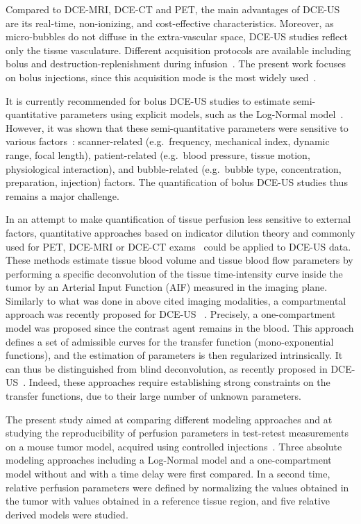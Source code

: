 Compared to DCE-MRI, DCE-CT and PET, the main advantages of DCE-US are its real-time, non-ionizing, and cost-effective characteristics. Moreover, as micro-bubbles do not diffuse in the extra-vascular space, DCE-US studies reflect only the tissue vasculature. 
Different acquisition protocols are available including bolus and destruction-replenishment during infusion~\cite{Wei1998tc}. The present work focuses on bolus injections, since this acquisition mode is the most widely used~\cite{Dietrich2012kw}. 

It is currently recommended for bolus DCE-US studies to estimate semi-quantitative parameters using explicit models, such as the Log-Normal model~\cite{Strouthos2010it}. 
However, it was shown that these semi-quantitative parameters were sensitive to various factors~\cite{Tang2011fj}: scanner-related (e.g.~frequency, mechanical index, dynamic range, focal length), patient-related (e.g.~blood pressure, tissue motion, physiological interaction), and bubble-related (e.g.~bubble type, concentration, preparation, injection) factors. The quantification of bolus DCE-US studies thus remains a major challenge.

In an attempt to make quantification of tissue perfusion less sensitive to external factors, quantitative approaches based on indicator dilution theory and commonly used for PET, DCE-MRI or DCE-CT exams~\cite{Tofts1999ih,Wedam2006bi,OConnor2007ku} could be  applied to DCE-US data.
These methods estimate tissue blood volume and  tissue blood flow parameters by performing a specific deconvolution of the tissue time-intensity curve inside the tumor by an Arterial Input Function (AIF) measured in the imaging plane.  Similarly to  what was done in above cited imaging modalities, a compartmental approach was recently proposed for DCE-US ~\cite{Doury2016tk}. Precisely, a one-compartment model was proposed since the contrast agent remains in the blood. This approach defines a set of admissible curves for the transfer function (mono-exponential functions), and the estimation of parameters is then regularized intrinsically. It can thus be distinguished from blind deconvolution, as recently proposed in DCE-US~\cite{Gauthier2012vc,Jirik2014hv}. Indeed, these  approaches require establishing strong constraints on the transfer functions, due to their large number of unknown parameters.

The present study aimed at comparing different modeling approaches and at studying the reproducibility of perfusion parameters in test-retest measurements on a mouse tumor model, acquired using controlled injections~\cite{Dizeux2016cd}. Three absolute modeling approaches including a Log-Normal model and a one-compartment model without and with a time delay were first compared. In a second time, relative perfusion parameters were defined by normalizing the values obtained in the tumor with values obtained in a reference tissue region, and five relative derived models were studied. 

